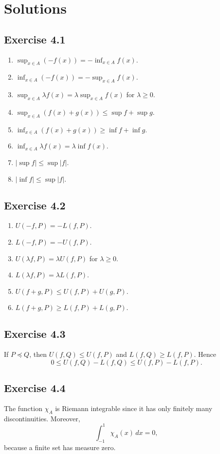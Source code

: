 \section*{Solutions}

\subsection*{Exercise 4.1}
\begin{solution}
\begin{enumerate}[label=\alph*)]
\item $\sup_{x\in A}(-f(x)) = -\inf_{x\in A} f(x)$.
\item $\inf_{x\in A}(-f(x)) = -\sup_{x\in A} f(x)$.
\item $\sup_{x\in A}\lambda f(x) = \lambda \sup_{x\in A} f(x)$ for $\lambda \geq 0$.
\item $\sup_{x\in A}(f(x)+g(x)) \leq \sup f + \sup g$.
\item $\inf_{x\in A}(f(x)+g(x)) \geq \inf f + \inf g$.
\item $\inf_{x\in A}\lambda f(x) = \lambda \inf f(x)$.
\item $|\sup f| \leq \sup |f|$.
\item $|\inf f| \leq \sup |f|$.
\end{enumerate}
\end{solution}

\subsection*{Exercise 4.2}
\begin{solution}
\begin{enumerate}[label=\alph*)]
\item $U(-f,P) = -L(f,P)$.
\item $L(-f,P) = -U(f,P)$.
\item $U(\lambda f,P) = \lambda U(f,P)$ for $\lambda \geq 0$.
\item $L(\lambda f,P) = \lambda L(f,P)$.
\item $U(f+g,P) \leq U(f,P) + U(g,P)$.
\item $L(f+g,P) \geq L(f,P) + L(g,P)$.
\end{enumerate}
\end{solution}

\subsection*{Exercise 4.3}
\begin{solution}
If $P \preceq Q$, then $U(f,Q) \leq U(f,P)$ and $L(f,Q) \geq L(f,P)$. Hence
\[
0 \leq U(f,Q)-L(f,Q) \leq U(f,P)-L(f,P).
\]
\end{solution}

\subsection*{Exercise 4.4}
\begin{solution}
The function $\chi_A$ is Riemann integrable since it has only finitely many discontinuities. Moreover,
\[
\int_{-1}^1 \chi_A(x)\, dx = 0,
\]
because a finite set has measure zero.
\end{solution}

